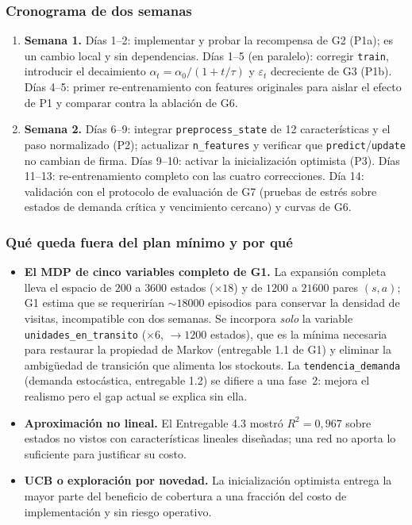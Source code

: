 \documentclass[11pt,letterpaper]{article}
\begin{document}
\subsubsection*{Cronograma de dos semanas}

\begin{enumerate}[leftmargin=*]
  \item \textbf{Semana 1.}
    Días 1--2: implementar y probar la recompensa de G2 (P1a); es un cambio
    local y sin dependencias.
    Días 1--5 (en paralelo): corregir \texttt{train}, introducir el decaimiento
    $\alpha_t = \alpha_0/(1 + t/\tau)$ y $\varepsilon_t$ decreciente de G3 (P1b).
    Días 4--5: primer re-entrenamiento con features originales para aislar el
    efecto de P1 y comparar contra la ablación de G6.
  \item \textbf{Semana 2.}
    Días 6--9: integrar \texttt{preprocess\_state} de 12 características y el
    paso normalizado (P2); actualizar \texttt{n\_features} y verificar que
    \texttt{predict}/\texttt{update} no cambian de firma.
    Días 9--10: activar la inicialización optimista (P3).
    Días 11--13: re-entrenamiento completo con las cuatro correcciones.
    Día 14: validación con el protocolo de evaluación de G7 (pruebas de estrés
    sobre estados de demanda crítica y vencimiento cercano) y curvas de G6.
\end{enumerate}

\subsubsection*{Qué queda fuera del plan mínimo y por qué}

\begin{itemize}[leftmargin=*]
  \item \textbf{El MDP de cinco variables completo de G1.} La expansión completa
    lleva el espacio de $200$ a $\num{3600}$ estados ($\times 18$) y de $\num{1200}$
    a $\num{21600}$ pares $(s,a)$; G1 estima que se requerirían $\sim\num{18000}$
    episodios para conservar la densidad de visitas, incompatible con dos semanas.
    Se incorpora \emph{solo} la variable \texttt{unidades\_en\_transito}
    ($\times 6$, $\to \num{1200}$ estados), que es la mínima necesaria para
    restaurar la propiedad de Markov (entregable 1.1 de G1) y eliminar la
    ambigüedad de transición que alimenta los stockouts. La \texttt{tendencia\_demanda}
    (demanda estocástica, entregable 1.2) se difiere a una fase~2: mejora el
    realismo pero el gap actual se explica sin ella.
  \item \textbf{Aproximación no lineal.} El Entregable 4.3 mostró $R^2 = 0{,}967$
    sobre estados no vistos con características lineales diseñadas; una red no
    aporta lo suficiente para justificar su costo.
  \item \textbf{UCB o exploración por novedad.} La inicialización optimista
    entrega la mayor parte del beneficio de cobertura a una fracción del costo de
    implementación y sin riesgo operativo.
\end{itemize}
\end{document}
